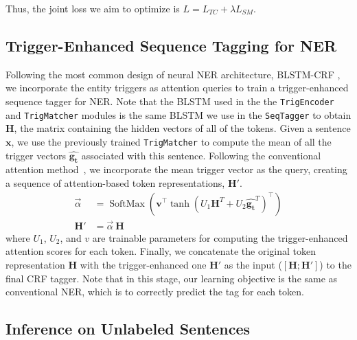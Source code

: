 Thus, the joint loss we aim to optimize is $L = L_{TC} + \lambda L_{SM}$. %



\subsection{Trigger-Enhanced Sequence Tagging for NER}
\label{sec:secondstage}
Following the most common design of neural NER architecture, BLSTM-CRF \citep{DBLP:conf/acl/MaH16}, we incorporate the entity triggers as attention queries 
to train a trigger-enhanced sequence tagger for NER. Note that the BLSTM used in the the \texttt{TrigEncoder} and \texttt{TrigMatcher} modules is the same BLSTM we use in the \texttt{SeqTagger} to obtain $\mathbf{H}$, the matrix containing the hidden vectors of all of the tokens.
Given a sentence $\mathbf{x}$, we use the previously trained \texttt{TrigMatcher} to compute the mean of all the trigger vectors $\hat{\mathbf{g_t}}$ associated with this sentence.
Following the conventional attention method~\citep{luong2015effective}, 
we incorporate the mean trigger vector as the query, creating a sequence of attention-based token representations, $\mathbf{H}'$.
{
    {
        \begin{align*} 
            \vec{\alpha}  &= \operatorname{SoftMax}\left(\boldsymbol{v}^{\top} \tanh \left({U}_{1}\mathbf{H}^T + {U}_{2}\hat{\mathbf{g_t}}^T \right)^{\top}\right)\\
            \mathbf{H'} &=  \vec{\alpha}~\mathbf{H}
        \end{align*} 
    }
}
\noindent
where $U_1$, $U_2$, and $v$ are trainable parameters for computing the trigger-enhanced attention scores for each token.
Finally, we concatenate the original token representation $\mathbf{H}$ with the trigger-enhanced one $\mathbf{H}'$ as the input ($[\mathbf{H};\mathbf{H}']$) to the final CRF tagger.
Note that in this stage, our learning objective is the same as conventional NER, which is to correctly predict the tag for each token.




\subsection{Inference on Unlabeled Sentences}
\label{sec:inference}


